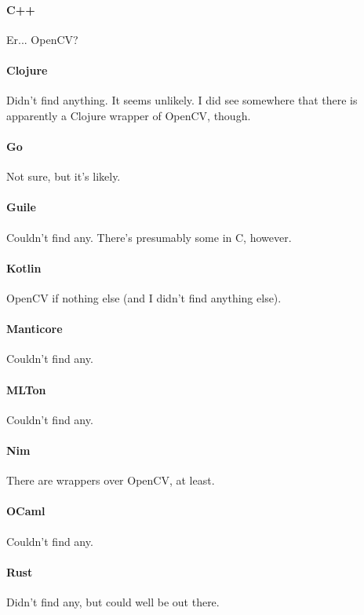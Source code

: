 \paragraph{C++}
Er... OpenCV?

\paragraph{Clojure}
Didn't find anything.  It seems unlikely.  I did see somewhere that there is apparently a Clojure wrapper of OpenCV, though.

\paragraph{Go}
Not sure, but it's likely.

\paragraph{Guile}
Couldn't find any.  There's presumably some in C, however.

\paragraph{Kotlin}
OpenCV if nothing else (and I didn't find anything else).

\paragraph{Manticore}
Couldn't find any.

\paragraph{MLTon}
Couldn't find any.

\paragraph{Nim}
There are wrappers over OpenCV, at least.

\paragraph{OCaml}
Couldn't find any.

\paragraph{Rust}
Didn't find any, but could well be out there.

